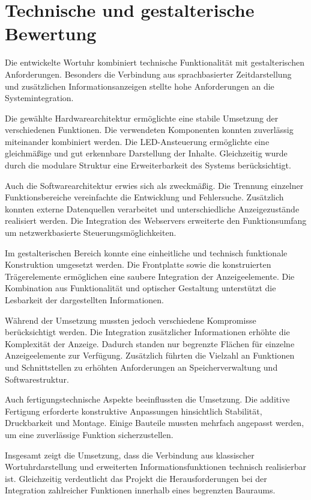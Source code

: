\section{Technische und gestalterische Bewertung} 
Die entwickelte Wortuhr kombiniert technische Funktionalität mit gestalterischen Anforderungen. 
Besonders die Verbindung aus sprachbasierter Zeitdarstellung und zusätzlichen Informationsanzeigen stellte hohe Anforderungen an die Systemintegration.

Die gewählte Hardwarearchitektur ermöglichte eine stabile Umsetzung der verschiedenen Funktionen. 
Die verwendeten Komponenten konnten zuverlässig miteinander kombiniert werden. 
Die LED-Ansteuerung ermöglichte eine gleichmäßige und gut erkennbare Darstellung der Inhalte. 
Gleichzeitig wurde durch die modulare Struktur eine Erweiterbarkeit des Systems berücksichtigt.

Auch die Softwarearchitektur erwies sich als zweckmäßig. 
Die Trennung einzelner Funktionsbereiche vereinfachte die Entwicklung und Fehlersuche. 
Zusätzlich konnten externe Datenquellen verarbeitet und unterschiedliche Anzeigezustände realisiert werden. 
Die Integration des Webservers erweiterte den Funktionsumfang um netzwerkbasierte Steuerungsmöglichkeiten.

Im gestalterischen Bereich konnte eine einheitliche und technisch funktionale Konstruktion umgesetzt werden. 
Die Frontplatte sowie die konstruierten Trägerelemente ermöglichen eine saubere Integration der Anzeigeelemente. 
Die Kombination aus Funktionalität und optischer Gestaltung unterstützt die Lesbarkeit der dargestellten Informationen.

Während der Umsetzung mussten jedoch verschiedene Kompromisse berücksichtigt werden. 
Die Integration zusätzlicher Informationen erhöhte die Komplexität der Anzeige. 
Dadurch standen nur begrenzte Flächen für einzelne Anzeigeelemente zur Verfügung. 
Zusätzlich führten die Vielzahl an Funktionen und Schnittstellen zu erhöhten Anforderungen an Speicherverwaltung und Softwarestruktur.

Auch fertigungstechnische Aspekte beeinflussten die Umsetzung. 
Die additive Fertigung erforderte konstruktive Anpassungen hinsichtlich Stabilität, Druckbarkeit und Montage. 
Einige Bauteile mussten mehrfach angepasst werden, um eine zuverlässige Funktion sicherzustellen.

Insgesamt zeigt die Umsetzung, dass die Verbindung aus klassischer Wortuhrdarstellung und erweiterten Informationsfunktionen technisch realisierbar ist. 
Gleichzeitig verdeutlicht das Projekt die Herausforderungen bei der Integration zahlreicher Funktionen innerhalb eines begrenzten Bauraums.